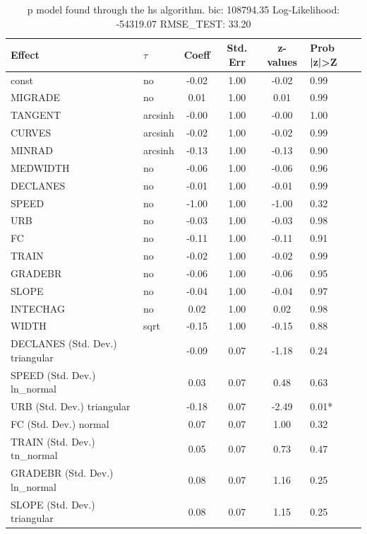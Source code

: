\begin{table}
	\caption{p model found through the hs algorithm. bic: 108794.35 Log-Likelihood: -54319.07 RMSE_TEST: 33.20}
	\begin{center}
		\begin{tabular}{|l|l|c|c|c|l|}
			\hline
			Effect & $\tau$ & Coeff & Std. Err & z-values & Prob |z|>Z \\
			\hline
			const & no & -0.02 & 1.00 & -0.02 & 0.99 \\
			\hline
			MIGRADE & no & 0.01 & 1.00 & 0.01 & 0.99 \\
			\hline
			TANGENT & arcsinh & -0.00 & 1.00 & -0.00 & 1.00 \\
			\hline
			CURVES & arcsinh & -0.02 & 1.00 & -0.02 & 0.99 \\
			\hline
			MINRAD & arcsinh & -0.13 & 1.00 & -0.13 & 0.90 \\
			\hline
			MEDWIDTH & no & -0.06 & 1.00 & -0.06 & 0.96 \\
			\hline
			DECLANES & no & -0.01 & 1.00 & -0.01 & 0.99 \\
			\hline
			SPEED & no & -1.00 & 1.00 & -1.00 & 0.32 \\
			\hline
			URB & no & -0.03 & 1.00 & -0.03 & 0.98 \\
			\hline
			FC & no & -0.11 & 1.00 & -0.11 & 0.91 \\
			\hline
			TRAIN & no & -0.02 & 1.00 & -0.02 & 0.99 \\
			\hline
			GRADEBR & no & -0.06 & 1.00 & -0.06 & 0.95 \\
			\hline
			SLOPE & no & -0.04 & 1.00 & -0.04 & 0.97 \\
			\hline
			INTECHAG & no & 0.02 & 1.00 & 0.02 & 0.98 \\
			\hline
			WIDTH & sqrt & -0.15 & 1.00 & -0.15 & 0.88 \\
			\hline
			DECLANES (Std. Dev.) triangular &  & -0.09 & 0.07 & -1.18 & 0.24 \\
			\hline
			SPEED (Std. Dev.) ln_normal &  & 0.03 & 0.07 & 0.48 & 0.63 \\
			\hline
			URB (Std. Dev.) triangular &  & -0.18 & 0.07 & -2.49 & 0.01* \\
			\hline
			FC (Std. Dev.) normal &  & 0.07 & 0.07 & 1.00 & 0.32 \\
			\hline
			TRAIN (Std. Dev.) tn_normal &  & 0.05 & 0.07 & 0.73 & 0.47 \\
			\hline
			GRADEBR (Std. Dev.) ln_normal &  & 0.08 & 0.07 & 1.16 & 0.25 \\
			\hline
			SLOPE (Std. Dev.) triangular &  & 0.08 & 0.07 & 1.15 & 0.25 \\

\end{tabular}
\end{center}
\end{table}
